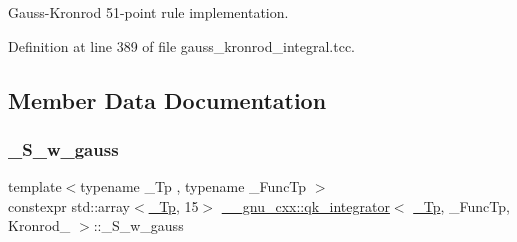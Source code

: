 Gauss-\/\+Kronrod 51-\/point rule implementation. 

Definition at line 389 of file gauss\+\_\+kronrod\+\_\+integral.\+tcc.



\subsection{Member Data Documentation}
\mbox{\label{struct____gnu__cxx_1_1qk__integrator_3_01__Tp_00_01__FuncTp_00_01Kronrod__61_01_4_aca2625a4a4a68167b09220e0a552f654}} 
\subsubsection{\texorpdfstring{\+\_\+\+S\+\_\+w\+\_\+gauss}{\_S\_w\_gauss}}
{\footnotesize\ttfamily template$<$typename \+\_\+\+Tp , typename \+\_\+\+Func\+Tp $>$ \\
constexpr std\+::array$<$\hyperlink{namespace____gnu__cxx_a3b19a9c800ca194374ef9172290f7d79}{\+\_\+\+Tp}, 15$>$ \hyperlink{class____gnu__cxx_1_1qk__integrator}{\+\_\+\+\_\+gnu\+\_\+cxx\+::qk\+\_\+integrator}$<$ \hyperlink{namespace____gnu__cxx_a3b19a9c800ca194374ef9172290f7d79}{\+\_\+\+Tp}, \+\_\+\+Func\+Tp, Kronrod\+\_ $>$\+::\+\_\+\+S\+\_\+w\+\_\+gauss\hspace{0.3cm}{\ttfamily [static]}}

